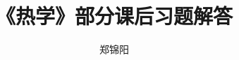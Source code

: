 \documentclass{ctexart}                             %
\begin{document}
\title{《热学》部分课后习题解答}
\author{郑锦阳}
\maketitle

\tableofcontents





\end{document}
